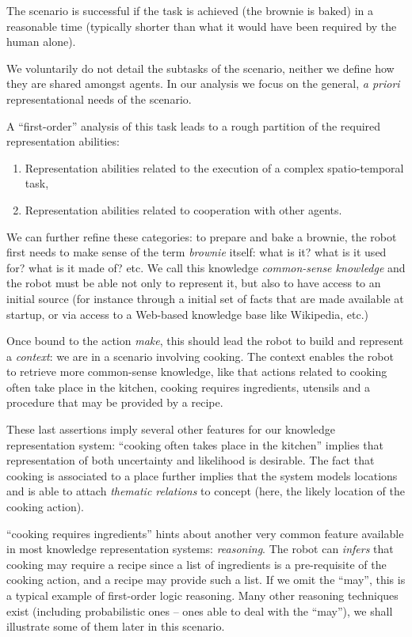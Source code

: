 The scenario is successful if the task is achieved (the brownie is baked) in a
reasonable time (typically shorter than what it would have been required by the
human alone).

We voluntarily do not detail the subtasks of the scenario, neither we define
how they are shared amongst agents. In our analysis we focus on the general,
\textit{a priori} representational needs of the scenario.

A ``first-order'' analysis of this task leads to a rough partition of the
required representation abilities:

\begin{enumerate}

	\item Representation abilities related to the execution of a complex
	spatio-temporal task,

	\item Representation abilities related to cooperation with other agents.

\end{enumerate}

We can further refine these categories: to prepare and bake a brownie, the
robot first needs to make sense of the term \emph{brownie} itself: what is it?
what is it used for? what is it made of? etc. We call this knowledge
\emph{common-sense knowledge} and the robot must be able not only to represent
it, but also to have access to an initial source (for instance through a initial
set of facts that are made available at startup, or via access to a Web-based
knowledge base like Wikipedia, etc.)

Once bound to the action \emph{make}, this should lead the robot to build and
represent a \emph{context}: we are in a scenario involving cooking. The context
enables the robot to retrieve more common-sense knowledge, like that actions
related to cooking often take place in the kitchen, cooking requires
ingredients, utensils and a procedure that may be provided by a recipe.

These last assertions imply several other features for our knowledge
representation system: ``cooking often takes place in the kitchen'' implies
that representation of both uncertainty and likelihood is desirable. The fact
that cooking is associated to a place further implies that the system models
locations and is able to attach \emph{thematic relations} to concept
(here, the likely location of the cooking action).

``cooking requires ingredients'' hints about another very common feature
available in most knowledge representation systems: \emph{reasoning}. The robot
can \emph{infers} that cooking may require a recipe since a list of ingredients
is a pre-requisite of the cooking action, and a recipe may provide such a list.
If we omit the ``may'', this is a typical example of first-order logic
reasoning. Many other reasoning techniques exist (including probabilistic ones
-- ones able to deal with the ``may''), we shall illustrate some of them later
in this scenario.

